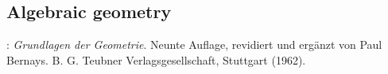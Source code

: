\documentclass[12pt]{article}
\begin{document}
\subsection{Algebraic geometry}

\begin{thebibliography}{8}
: {\em Grundlagen der Geometrie}. Neunte Auflage, revidiert und erg\"anzt von Paul Bernays.\;  B. G. Teubner Verlagsgesellschaft, Stuttgart (1962).
\end{thebibliography} 
\end{document}
